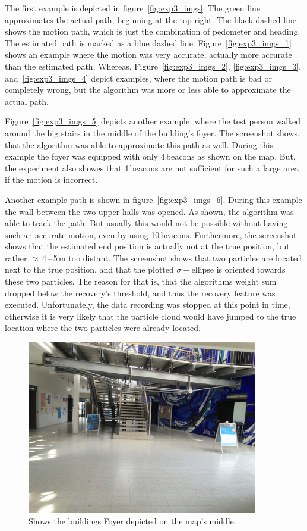 The first example is depicted in figure~\ref{fig:exp3_imgs}. The green line approximates the actual path, beginning at the top right. The black dashed line shows the motion path, which is just the combination of pedometer and heading. The estimated path is marked as a blue dashed line. Figure~\ref{fig:exp3_imgs_1} shows an example where the motion was very accurate, actually more accurate than the estimated path. Whereas, Figure~\ref{fig:exp3_imgs_2}, \ref{fig:exp3_imgs_3}, and~\ref{fig:exp3_imgs_4} depict examples, where the motion path is bad or completely wrong, but the algorithm was more or less able to approximate the actual path.

Figure~\ref{fig:exp3_imgs_5} depicts another example, where the test person walked around the big stairs in the middle of the building's foyer. The screenshot shows, that the algorithm was able to approximate this path as well. During this example the foyer was equipped with only 4\,beacons as shown on the map. But, the experiment also showes that 4\,beacons are not sufficient for such a large area if the motion is incorrect.

Another example path is shown in figure~\ref{fig:exp3_imgs_6}. During this example the wall between the two upper halls was opened. As shown, the algorithm was able to track the path. But usually this would not be possible without having such an accurate motion, even by using 10\,beacons. Furthermore, the screenshot shows that the estimated end position is actually not at the true position, but rather $\approx$\,4\,--\,5\,m too distant. The screenshot shows that two particles are located next to the true position, and that the plotted $\sigma-\text{ellipse}$ is oriented towards these two particles. The reason for that is, that the algorithms weight sum dropped below the recovery's threshold, and thus the recovery feature was executed. Unfortunately, the data recording was stopped at this point in time, otherwise it is very likely that the particle cloud would have jumped to the true location where the two particles were already located. 


\begin{figure}
	\includegraphics[width=0.9\textwidth]{figures/F-Foyer}
	\caption{Shows the buildings Foyer depicted on the map's middle.}
	\label{fig:f-foyer}
\end{figure}

